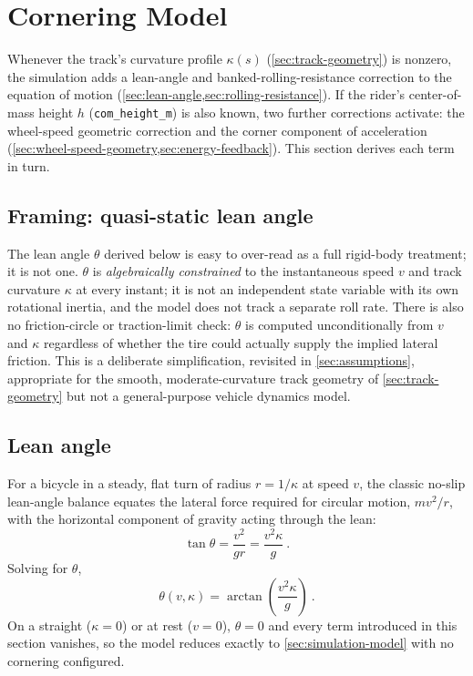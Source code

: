 \section{Cornering Model}
\label{sec:cornering-model}

Whenever the track's curvature profile $\kappa(s)$ (\cref{sec:track-geometry})
is nonzero, the simulation adds a lean-angle and banked-rolling-resistance
correction to the equation of motion (\cref{sec:lean-angle,sec:rolling-resistance}).
If the rider's center-of-mass height $h$ (\nolinkurl{com_height_m}) is also
known, two further corrections activate: the wheel-speed geometric correction
and the corner component of acceleration
(\cref{sec:wheel-speed-geometry,sec:energy-feedback}). This section derives
each term in turn.

\subsection{Framing: quasi-static lean angle}
\label{sec:quasi-static-lean}

The lean angle $\theta$ derived below is easy to over-read as a full rigid-body
treatment; it is not one. $\theta$ is \emph{algebraically constrained} to
the instantaneous speed $v$ and track curvature $\kappa$ at every instant; it is
not an independent state variable with its own rotational inertia, and the model
does not track a separate roll rate. There is also no friction-circle or
traction-limit check: $\theta$ is computed unconditionally from $v$ and
$\kappa$ regardless of whether the tire could actually supply the implied
lateral friction. This is a deliberate simplification, revisited in
\cref{sec:assumptions}, appropriate for the smooth, moderate-curvature track
geometry of \cref{sec:track-geometry} but not a general-purpose vehicle dynamics
model.

\subsection{Lean angle}
\label{sec:lean-angle}

For a bicycle in a steady, flat turn of radius $r = 1/\kappa$ at speed $v$, the
classic no-slip lean-angle balance equates the lateral force required for
circular motion, $m v^2 / r$, with the horizontal component of gravity acting
through the lean:
\begin{equation}
    \tan\theta = \frac{v^2}{g r} = \frac{v^2 \kappa}{g}\ .
    \label{eq:lean-angle-tan}
\end{equation}
Solving for $\theta$,
\begin{equation}
    \theta(v,\kappa) = \arctan\!\left(\frac{v^2 \kappa}{g}\right)\ .
    \label{eq:lean-angle}
\end{equation}
On a straight ($\kappa = 0$) or at rest ($v=0$), $\theta = 0$ and every term
introduced in this section vanishes, so the model reduces exactly to
\cref{sec:simulation-model} with no cornering configured.

